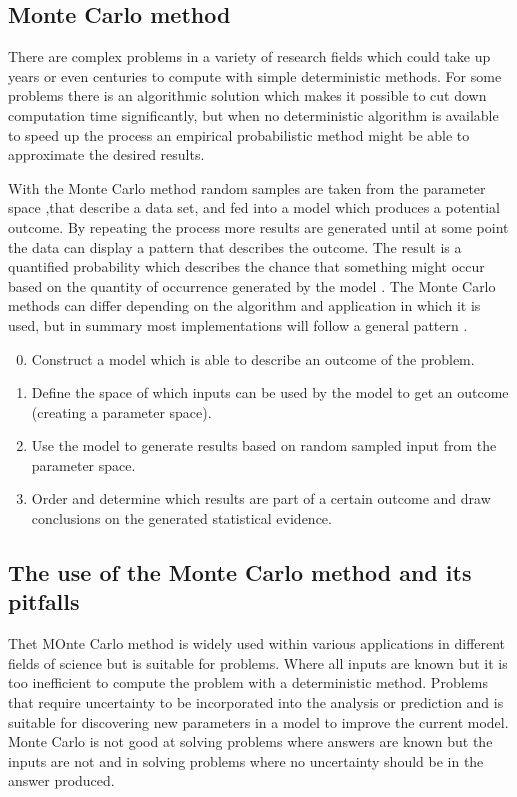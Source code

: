 \subsection{Monte Carlo method}
There are complex problems in a variety of research fields which could take up years or even centuries to compute with simple deterministic methods. For some problems there is an algorithmic solution which makes it possible to cut down computation time significantly, but when no deterministic algorithm is available to speed up the process an empirical probabilistic method might be able to approximate the desired results. 

With the Monte Carlo method random samples are taken from the parameter space ,that describe a data set, and fed into a model which produces a potential outcome. By repeating the process more results are generated until at some point the data can display a pattern that describes the outcome. The result is a quantified probability which describes the chance that something might occur based on the quantity of occurrence generated by the model \cite{stephanie_monte_2015,wikipedia_monte_2019,wikipedia_monte-carlosimulatie_2018}.
\newline
\newline
The Monte Carlo methods can differ depending on the algorithm and application in which it is used, but in summary most implementations will follow a general pattern \cite{wikipedia_monte_2019}.
\begin{enumerate}
	\setcounter{enumi}{-1}
	\item Construct a model which is able to describe an outcome of the problem.
	\item Define the space of which inputs can be used by the model to get an outcome (creating a parameter space). 
	\item Use the model to generate results based on random sampled input from the parameter space.
	\item Order and determine which results are part of a certain outcome and draw conclusions on the generated statistical evidence.
\end{enumerate}

\label{subsec:Monte_Carlo_Method}

\subsection{The use of the Monte Carlo method and its pitfalls}
Thet MOnte Carlo method is widely used within various applications in different fields of science but is suitable for problems. Where all inputs are known but it is too inefficient to compute the problem with a deterministic method. Problems that require uncertainty to be incorporated into the analysis or prediction and is suitable for discovering new parameters in a model to improve the current model. Monte Carlo is not good at solving problems where answers are known but the inputs are not and in solving problems where no uncertainty should be in the answer produced.

